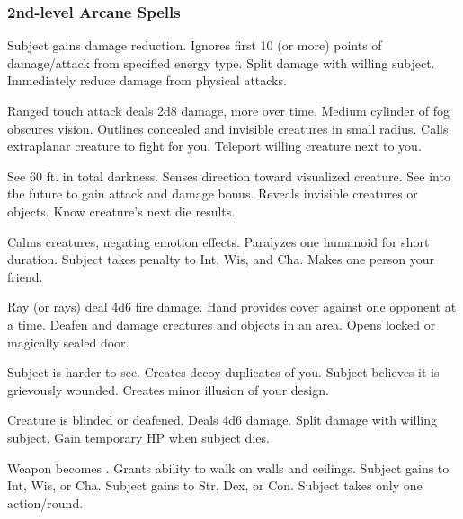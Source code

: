 \subsubsection{2nd-level Arcane Spells} 
\begin{swspelllist}
   Subject gains damage reduction.
   Ignores first 10 (or more) points of damage/attack from specified energy type.
   Split damage with willing subject.
   Immediately reduce damage from physical attacks.

   Ranged touch attack deals 2d8 damage, more over time.
   Medium cylinder of fog obscures vision.
   Outlines concealed and invisible creatures in small radius.
   Calls extraplanar creature to fight for you.
   Teleport willing creature next to you.

   See 60 ft. in total darkness.
   Senses direction toward visualized creature.
   See into the future to gain attack and damage bonus.
   Reveals invisible creatures or objects.
   Know creature's next die results.

   Calms creatures, negating emotion effects.
   Paralyzes one humanoid for short duration.
   Subject takes  penalty to Int, Wis, and Cha.
   Makes one person your friend.

   Ray (or rays) deal 4d6 fire damage.
   Hand provides cover against one opponent at a time.
   Deafen and damage creatures and objects in an area. 
   Opens locked or magically sealed door.

   Subject is harder to see.
   Creates decoy duplicates of you.
   Subject believes it is grievously wounded.
   Creates minor illusion of your design.

   Creature is blinded or deafened.
   Deals 4d6 damage.
   Split damage with willing subject.
   Gain temporary HP when subject dies.

   Weapon becomes .
   Grants ability to walk on walls and ceilings.
   Subject gains  to Int, Wis, or Cha.
   Subject gains  to Str, Dex, or Con.
   Subject takes only one action/round.
\end{swspelllist}

